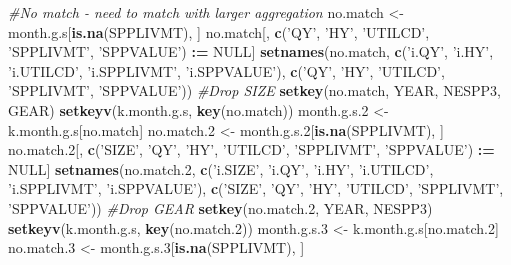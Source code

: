 \documentclass[]{article}
\newenvironment{Shaded}{\begin{snugshade}}{\end{snugshade}}
\newcommand{\KeywordTok}[1]{\textcolor[rgb]{0.13,0.29,0.53}{\textbf{#1}}}
\newcommand{\DecValTok}[1]{\textcolor[rgb]{0.00,0.00,0.81}{#1}}
\newcommand{\StringTok}[1]{\textcolor[rgb]{0.31,0.60,0.02}{#1}}
\newcommand{\CommentTok}[1]{\textcolor[rgb]{0.56,0.35,0.01}{\textit{#1}}}
\newcommand{\OtherTok}[1]{\textcolor[rgb]{0.56,0.35,0.01}{#1}}
\newcommand{\OperatorTok}[1]{\textcolor[rgb]{0.81,0.36,0.00}{\textbf{#1}}}
\newcommand{\ErrorTok}[1]{\textcolor[rgb]{0.64,0.00,0.00}{\textbf{#1}}}
\newcommand{\NormalTok}[1]{#1}
\begin{document}
\begin{Shaded}
\begin{Highlighting}[]
{{{{{{{{{{{{{{{{{{{{{  \CommentTok{#No match - need to match with larger aggregation}
\NormalTok{  no.match  <-}\StringTok{ }\NormalTok{month.g.s[}\KeywordTok{is.na}\NormalTok{(SPPLIVMT), ]}
\NormalTok{  no.match[, }\KeywordTok{c}\NormalTok{(}\StringTok{'QY'}\NormalTok{, }\StringTok{'HY'}\NormalTok{, }\StringTok{'UTILCD'}\NormalTok{, }\StringTok{'SPPLIVMT'}\NormalTok{, }\StringTok{'SPPVALUE'}\NormalTok{) }\OperatorTok{:}\ErrorTok{=}\StringTok{ }\OtherTok{NULL}\NormalTok{]}
  \KeywordTok{setnames}\NormalTok{(no.match, }\KeywordTok{c}\NormalTok{(}\StringTok{'i.QY'}\NormalTok{, }\StringTok{'i.HY'}\NormalTok{, }\StringTok{'i.UTILCD'}\NormalTok{, }\StringTok{'i.SPPLIVMT'}\NormalTok{, }\StringTok{'i.SPPVALUE'}\NormalTok{), }
           \KeywordTok{c}\NormalTok{(}\StringTok{'QY'}\NormalTok{, }\StringTok{'HY'}\NormalTok{, }\StringTok{'UTILCD'}\NormalTok{, }\StringTok{'SPPLIVMT'}\NormalTok{, }\StringTok{'SPPVALUE'}\NormalTok{))}
  \CommentTok{#Drop SIZE}
  \KeywordTok{setkey}\NormalTok{(no.match, YEAR, NESPP3, GEAR)}
  \KeywordTok{setkeyv}\NormalTok{(k.month.g.s, }\KeywordTok{key}\NormalTok{(no.match))}
\NormalTok{  month.g.s.}\DecValTok{2}\NormalTok{ <-}\StringTok{ }\NormalTok{k.month.g.s[no.match]}
\NormalTok{  no.match.}\DecValTok{2}\NormalTok{ <-}\StringTok{ }\NormalTok{month.g.s.}\DecValTok{2}\NormalTok{[}\KeywordTok{is.na}\NormalTok{(SPPLIVMT), ]}
\NormalTok{  no.match.}\DecValTok{2}\NormalTok{[, }\KeywordTok{c}\NormalTok{(}\StringTok{'SIZE'}\NormalTok{, }\StringTok{'QY'}\NormalTok{, }\StringTok{'HY'}\NormalTok{, }\StringTok{'UTILCD'}\NormalTok{, }\StringTok{'SPPLIVMT'}\NormalTok{, }\StringTok{'SPPVALUE'}\NormalTok{) }\OperatorTok{:}\ErrorTok{=}\StringTok{ }\OtherTok{NULL}\NormalTok{]}
  \KeywordTok{setnames}\NormalTok{(no.match.}\DecValTok{2}\NormalTok{, }\KeywordTok{c}\NormalTok{(}\StringTok{'i.SIZE'}\NormalTok{, }\StringTok{'i.QY'}\NormalTok{, }\StringTok{'i.HY'}\NormalTok{, }\StringTok{'i.UTILCD'}\NormalTok{, }\StringTok{'i.SPPLIVMT'}\NormalTok{, }\StringTok{'i.SPPVALUE'}\NormalTok{), }
           \KeywordTok{c}\NormalTok{(}\StringTok{'SIZE'}\NormalTok{, }\StringTok{'QY'}\NormalTok{, }\StringTok{'HY'}\NormalTok{, }\StringTok{'UTILCD'}\NormalTok{, }\StringTok{'SPPLIVMT'}\NormalTok{, }\StringTok{'SPPVALUE'}\NormalTok{))}
  \CommentTok{#Drop GEAR}
  \KeywordTok{setkey}\NormalTok{(no.match.}\DecValTok{2}\NormalTok{, YEAR, NESPP3)}
  \KeywordTok{setkeyv}\NormalTok{(k.month.g.s, }\KeywordTok{key}\NormalTok{(no.match.}\DecValTok{2}\NormalTok{))}
\NormalTok{  month.g.s.}\DecValTok{3}\NormalTok{ <-}\StringTok{ }\NormalTok{k.month.g.s[no.match.}\DecValTok{2}\NormalTok{]}
\NormalTok{  no.match.}\DecValTok{3}\NormalTok{ <-}\StringTok{ }\NormalTok{month.g.s.}\DecValTok{3}\NormalTok{[}\KeywordTok{is.na}\NormalTok{(SPPLIVMT), ]}
}}}}}}}}}}}}}}}}}}}}}
\end{Highlighting}
\end{Shaded}
\end{document}
